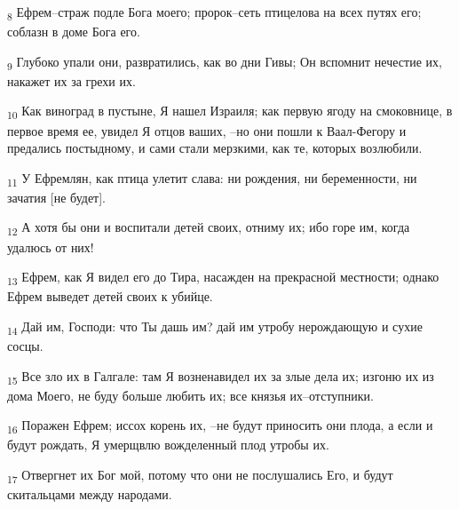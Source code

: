 \begin{tcolorbox}
\textsubscript{8} Ефрем--страж подле Бога моего; пророк--сеть птицелова на всех путях его; соблазн в доме Бога его.
\end{tcolorbox}
\begin{tcolorbox}
\textsubscript{9} Глубоко упали они, развратились, как во дни Гивы; Он вспомнит нечестие их, накажет их за грехи их.
\end{tcolorbox}
\begin{tcolorbox}
\textsubscript{10} Как виноград в пустыне, Я нашел Израиля; как первую ягоду на смоковнице, в первое время ее, увидел Я отцов ваших, --но они пошли к Ваал-Фегору и предались постыдному, и сами стали мерзкими, как те, которых возлюбили.
\end{tcolorbox}
\begin{tcolorbox}
\textsubscript{11} У Ефремлян, как птица улетит слава: ни рождения, ни беременности, ни зачатия [не будет].
\end{tcolorbox}
\begin{tcolorbox}
\textsubscript{12} А хотя бы они и воспитали детей своих, отниму их; ибо горе им, когда удалюсь от них!
\end{tcolorbox}
\begin{tcolorbox}
\textsubscript{13} Ефрем, как Я видел его до Тира, насажден на прекрасной местности; однако Ефрем выведет детей своих к убийце.
\end{tcolorbox}
\begin{tcolorbox}
\textsubscript{14} Дай им, Господи: что Ты дашь им? дай им утробу нерождающую и сухие сосцы.
\end{tcolorbox}
\begin{tcolorbox}
\textsubscript{15} Все зло их в Галгале: там Я возненавидел их за злые дела их; изгоню их из дома Моего, не буду больше любить их; все князья их--отступники.
\end{tcolorbox}
\begin{tcolorbox}
\textsubscript{16} Поражен Ефрем; иссох корень их, --не будут приносить они плода, а если и будут рождать, Я умерщвлю вожделенный плод утробы их.
\end{tcolorbox}
\begin{tcolorbox}
\textsubscript{17} Отвергнет их Бог мой, потому что они не послушались Его, и будут скитальцами между народами.
\end{tcolorbox}
